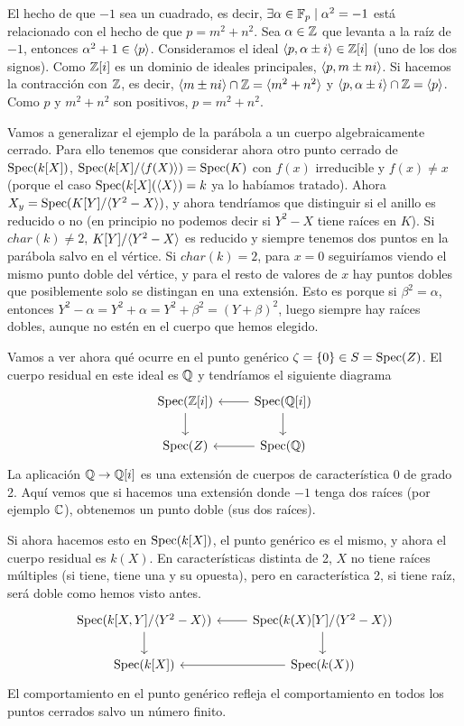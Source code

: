 \documentclass[GA.tex]{subfiles}
\begin{document}
\begin{nota}
El hecho de que $-1$ sea un cuadrado, es decir, $\exists\alpha\in\mathbb{F}_p\mid \alpha^2=-1$ está relacionado con el hecho de que $p=m^2+n^2$. Sea $\alpha\in\mathbb{Z}$ que levanta a la raíz de $-1$, entonces $\alpha^2+1\in\langle{p}\rangle$. Consideramos el ideal $\langle{p,\alpha\pm i}\rangle\in\mathbb{Z}[i]$ (uno de los dos signos). Como $\mathbb{Z}[i]$ es un dominio de ideales principales, $\langle{p,m\pm ni}\rangle$. Si hacemos la contracción con $\mathbb{Z}$, es decir, $\langle{m\pm ni}\rangle\cap\mathbb{Z}=\langle{m^2+n^2}\rangle$ y $\langle{p,\alpha\pm i}\rangle\cap\mathbb{Z}=\langle{p}\rangle$. Como $p$ y $m^2+n^2$ son positivos, $p=m^2+n^2$. 
\end{nota}

\begin{ej}
Vamos a generalizar el ejemplo de la parábola a un cuerpo algebraicamente cerrado. Para ello tenemos que considerar ahora otro punto cerrado de $\operatorname{Spec}(k[X])$, $\operatorname{Spec}(k[X]/\langle{f(X)}\rangle)=\operatorname{Spec}(K)$ con $f(x)$ irreducible y $f(x)\neq x$ (porque el caso $\operatorname{Spec}(k[X](\langle{X}\rangle)=k$ ya lo habíamos tratado). Ahora $X_y=\operatorname{Spec}(K[Y]/\langle{Y^2-X}\rangle)$, y ahora tendríamos que distinguir si el anillo es reducido o no (en principio no podemos decir si $Y^2-X$ tiene raíces en $K$). Si $char(k)\neq 2$, $K[Y]/\langle{Y^2-X}\rangle$ es reducido y siempre tenemos dos puntos en la parábola salvo en el vértice. Si $char(k)=2$, para $x=0$ seguiríamos viendo el mismo punto doble del vértice, y para el resto de valores de $x$ hay puntos dobles que posiblemente solo se distingan en una extensión. Esto es porque si $\beta^2=\alpha$, entonces $Y^2-\alpha=Y^2+\alpha=Y^2+\beta^2=(Y+\beta)^2$, luego siempre hay raíces dobles, aunque no estén en el cuerpo que hemos elegido. 

Vamos a ver ahora qué ocurre en el punto genérico $\zeta=\{0\}\in S=\operatorname{Spec}(Z)$. El cuerpo residual en este ideal es $\mathbb{Q}$ y tendríamos el siguiente diagrama
\[
\begin{tikzcd}
\spec(\Z[i])\arrow[d] & \spec(\Q[i])\arrow[l]\arrow[d]\\
\spec(Z) & \spec(\Q)\arrow[l]
\end{tikzcd}
\]
La aplicación $\mathbb{Q}\to\mathbb{Q}[i]$ es una extensión de cuerpos de característica 0 de grado 2. Aquí vemos que si hacemos una extensión donde $-1$ tenga dos raíces (por ejemplo $\mathbb{C}$), obtenemos un punto doble (sus dos raíces).

Si ahora hacemos esto en $\operatorname{Spec}(k[X])$, el punto genérico es el mismo, y ahora el cuerpo residual es $k(X)$. En características distinta de 2, $X$ no tiene raíces múltiples (si tiene, tiene una y su opuesta), pero en característica 2, si tiene raíz, será doble como hemos visto antes.
\[
\begin{tikzcd}
\spec(k[X,Y]/\gene{Y^2-X})\arrow[d] & \spec(k(X)[Y]/\gene{Y^2-X})\arrow[d]\arrow[l]\\
\spec(k[X])& \arrow[l]\spec(k(X))
\end{tikzcd}
\]
El comportamiento en el punto genérico refleja el comportamiento en todos los puntos cerrados salvo un número finito. 
\end{ej}
\end{document}
